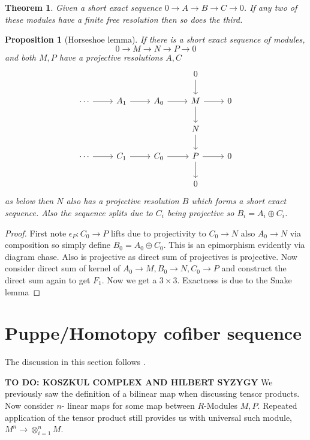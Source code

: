 \documentclass[12pt]{report}
\numberwithin{equation}{section}
\newtheorem{theorem}[dummy]{Theorem}
\newtheorem{proposition}[dummy]{Proposition}
\begin{document}
	\begin{theorem}\label{finitefreeresolutionninelemma}
		Given a short exact sequence $0 \to A \to B \to C\to 0$. If any two of these modules have a finite free resolution then so does the third.
	\end{theorem}
	
	\begin{proposition}[Horseshoe lemma]
		If there is a short exact sequence of modules,
		\[ 0 \to M \to N \to P \to 0 \]
		and both $M,P$ have a projective resolutions $A, C$ 
		\[\begin{tikzcd}
			&&& 0 \\
			\cdots & {A_1} & {A_0} & M & 0 \\
			&&& N \\
			\cdots & {C_1} & {C_0} & P & 0 \\
			&&& 0
			\arrow[from=2-4, to=2-5]
			\arrow[from=1-4, to=2-4]
			\arrow[from=2-4, to=3-4]
			\arrow[from=3-4, to=4-4]
			\arrow[from=4-4, to=4-5]
			\arrow[from=4-4, to=5-4]
			\arrow[ from=4-3, to=4-4]
			\arrow[ from=2-3, to=2-4]
			\arrow[from=2-1, to=2-2]
			\arrow[from=2-2, to=2-3]
			\arrow[from=4-1, to=4-2]
			\arrow[from=4-2, to=4-3]
		\end{tikzcd}\]
		as below then $N$ also has a projective resolution $B$ which forms a short exact sequence. Also the sequence splits due to $C_i$ being projective so $B_i=A_i \oplus C_i$.
	\end{proposition}
	\begin{proof}
		First note $\epsilon_P: C_0 \to P$ lifts due to projectivity to $C_0 \to N$ also $A_0\to N$ via composition so simply define $B_0 = A_0 \oplus C_0$. This is an epimorphism evidently via diagram chase. Also is projective as direct sum of projectives is projective. Now consider direct sum of kernel of $A_0 \to M, B_0 \to N, C_0 \to P$ and construct the direct sum again to get $F_1$.	Now we get a $3\times 3$. Exactness is due to the Snake lemma
	\end{proof}

	
	\section{Puppe/Homotopy cofiber sequence}
	The discussion in this section follows \cite{weibel_1994}.
	
		\textbf{TO DO: KOSZKUL COMPLEX AND HILBERT SYZYGY}
		We previously saw the definition of a bilinear map when discussing tensor products. Now consider $n$- linear maps for some map between $R$-Modules $M,P$. Repeated application of the tensor product still provides us with universal such module, $M^n \to \otimes_{i=1}^n M$.
		
\end{document}
